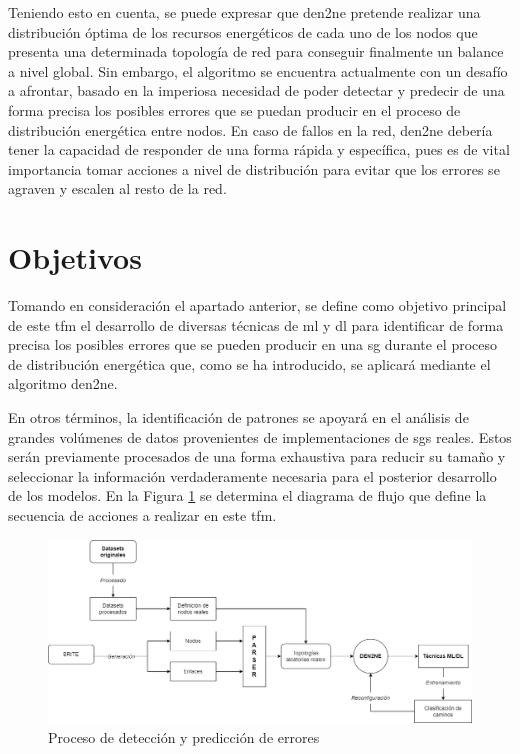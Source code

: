 \pagebreak

Teniendo esto en cuenta, se puede expresar que \gls{den2ne} pretende realizar una distribución óptima de los recursos energéticos de cada uno de los nodos que presenta una determinada topología de red para conseguir finalmente un balance a nivel global. Sin embargo, el algoritmo se encuentra actualmente con un desafío a afrontar, basado en la imperiosa necesidad de poder detectar y predecir de una forma precisa los posibles errores que se puedan producir en el proceso de distribución energética entre nodos. En caso de fallos en la red, \gls{den2ne} debería tener la capacidad de responder de una forma rápida y específica, pues es de vital importancia tomar acciones a nivel de distribución para evitar que los errores se agraven y escalen al resto de la red.

\vspace{3mm}

\section{Objetivos}
\label{sec:obj}

Tomando en consideración el apartado anterior, se define como objetivo principal de este \gls{tfm} el desarrollo de diversas técnicas de \gls{ml} y \gls{dl} para identificar de forma precisa los posibles errores que se pueden producir en una \gls{sg} durante el proceso de distribución energética que, como se ha introducido, se aplicará mediante el algoritmo \gls{den2ne}. 

\vspace{3mm}

En otros términos, la identificación de patrones se apoyará en el análisis de grandes volúmenes de datos provenientes de implementaciones de \gls{sg}s reales. Estos serán previamente procesados de una forma exhaustiva para reducir su tamaño y seleccionar la información verdaderamente necesaria para el posterior desarrollo de los modelos. En la Figura \ref{fig:intro} se determina el diagrama de flujo que define la secuencia de acciones a realizar en este \gls{tfm}.

\vspace{4mm}

\begin{figure}[h!]
    \centering
    \includegraphics[width=1\textwidth]{img/intro/anteproyecto.drawio.png}
    \caption{Proceso de detección y predicción de errores}
    \label{fig:intro}
\end{figure}


